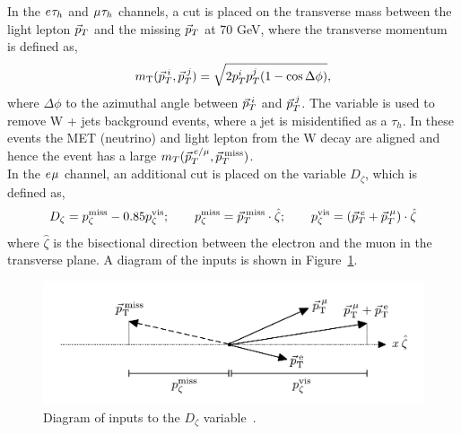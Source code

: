 In the $e_{}\tau_{h}$ and $\mu_{}\tau_{h}$ channels, a cut is placed on the transverse mass between the light lepton $\vec{p}_{T}$ and the missing $\vec{p}_{T}$ at 70 GeV, where the transverse momentum is defined as,
\begin{equation}
m_{\text{T}}(\vec{p}_{T}^{\hspace{2pt}i},\vec{p}_{T}^{\hspace{2pt}j}) = \sqrt{2p_{T}^{i}p_{T}^{j}(1-\cos\Delta\phi)},
\label{eqn:mt}
\end{equation}
where $\Delta\phi$ to the azimuthal angle between $\vec{p}_{T}^{\hspace{2pt}i}$ and $\vec{p}_{T}^{\hspace{2pt}j}$.
The variable is used to remove W + jets background events, where a jet is misidentified as a $\tau_h$.
In these events the \ac{MET} (neutrino) and light lepton from the W decay are aligned and hence the event has a large $m_{T}(\vec{p}_{T}^{\hspace{2pt}e/\mu},\vec{p}_{T}^{\hspace{2pt}\text{miss}})$. \\

In the $e_{}\mu_{}$ channel, an additional cut is placed on the variable $D_{\zeta}$, which is defined as,
\begin{equation}
D_\zeta = p_\zeta^\text{miss} - 0.85 p_\zeta^\text{vis};\qquad
p_\zeta^\text{miss} = \vec{p}_{T}^{\hspace{2pt}\text{miss}} \cdot \hat{\zeta};\qquad
p_\zeta^\text{vis} = (\vec{p}_{T}^{\hspace{2pt}e} + \vec{p}_{T}^{\hspace{2pt}\mu}) \cdot \hat{\zeta}
\label{eqn:Dzeta_def}
\end{equation}
where $\hat{\zeta}$ is the bisectional direction between the electron and the muon in the transverse plane.
A diagram of the inputs is shown in Figure~\ref{fig:dzeta_diagram}. \\
\begin{figure}[!hbtp]
\centering
    \includegraphics[width=1.0\textwidth]{Figures/dzeta_diagram.pdf}
\caption{Diagram of inputs to the $D_\zeta$ variable~\cite{CMS:2022rbd}.}
\label{fig:dzeta_diagram}
\end{figure}

